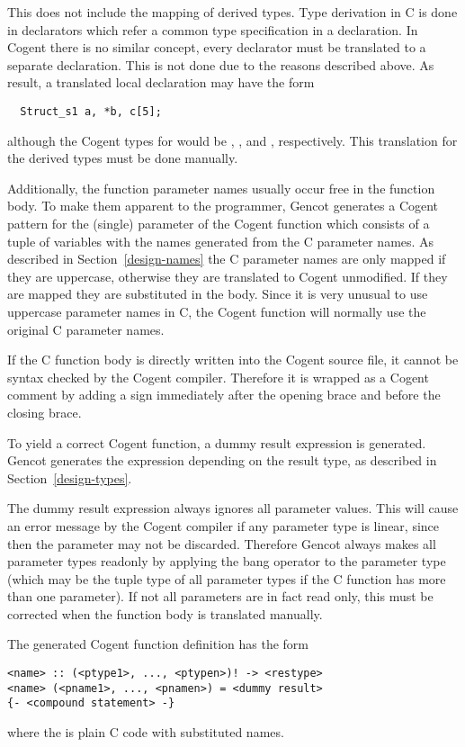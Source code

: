 This does not include the mapping of derived types. Type derivation in C is done in declarators which refer
a common type specification in a declaration. In Cogent there is no similar concept, every declarator must be 
translated to a separate declaration. This is not done due to the reasons described above. As result, a translated
local declaration may have the form
\begin{verbatim}
  Struct_s1 a, *b, c[5];
\end{verbatim}
although the Cogent types for  would be , , and 
, respectively. This translation for the derived types must be done manually.

Additionally, the function parameter names usually occur free in the function body. To make them apparent to
the programmer, Gencot generates a Cogent pattern for the (single) parameter of the Cogent function which 
consists of a tuple of variables with the names generated from the C parameter names. As described in 
Section~\ref{design-names} the C parameter names are only mapped if they are uppercase, otherwise they are
translated to Cogent unmodified. If they are mapped they are substituted in the body. Since it is very unusual
to use uppercase parameter names in C, the Cogent function will normally use the original C parameter names.

If the C function body is directly written into the Cogent source file, it cannot be syntax checked by the 
Cogent compiler. Therefore it is wrapped as a Cogent comment by adding a \code{-} sign immediately after the
opening brace and before the closing brace.

To yield a correct Cogent function, a dummy result expression is generated. Gencot generates the expression
depending on the result type, as described in Section~\ref{design-types}. 

The dummy result expression always ignores all parameter values. This will cause an error message by the
Cogent compiler if any parameter type is linear, since then the parameter may not be discarded. Therefore
Gencot always makes all parameter types readonly by applying the bang operator to the parameter type
(which may be the tuple type of all parameter types if the C function has more than one parameter). If 
not all parameters are in fact read only, this must be corrected when the function body is translated
manually.

The generated Cogent function definition has the form
\begin{verbatim}
<name> :: (<ptype1>, ..., <ptypen>)! -> <restype>
<name> (<pname1>, ..., <pnamen>) = <dummy result>
{- <compound statement> -}
\end{verbatim}
where the  is plain C code with substituted names.

